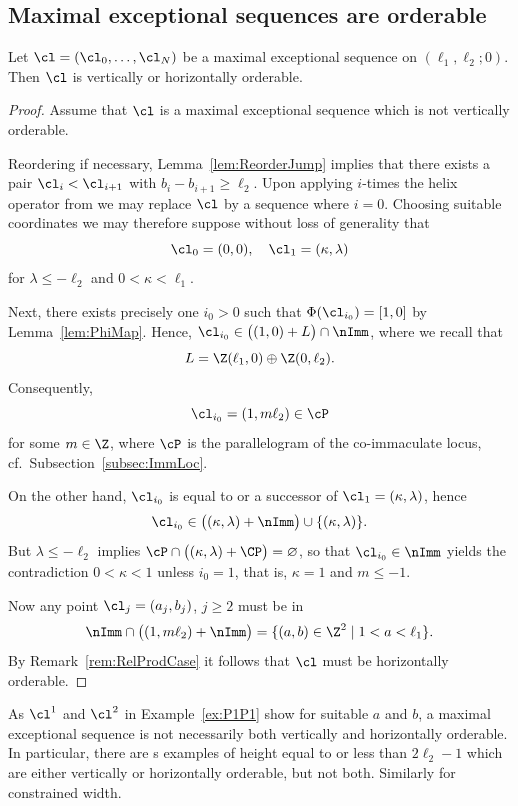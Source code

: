 \subsection{Maximal exceptional 
sequences are orderable}
\label{subsec:ReLExProdCase}

\begin{theorem}
\label{thm:MESRelProdCase}
Let $\cl=(\cl_0,\ldots,\cl_N)$ 
be a maximal exceptional sequence on 
$(\ell_1,\ell_2;0)$. Then $\cl$ is 
vertically or horizontally orderable. 
\end{theorem}

\begin{proof}
{Assume that $\cl$ is a maximal 
exceptional sequence which is {not vertically} 
orderable.}

{Reordering if necessary, Lemma~\ref{lem:ReorderJump}
implies that there exists a pair $\cl_i<\cl_{i+1}$
with $b_i-b_{i+1}\geq\ell_2$. Upon
applying $i$-times the helix operator from 
 we may replace $\cl$
by a sequence where $i=0$. Choosing suitable
coordinates we may therefore suppose
without loss of generality that
$$
\cl_0=(0,0),\quad\cl_1=(\kappa,\lambda)
$$
for $\lambda\leq-\ell_2$ and 
$0<\kappa<\ell_1$.}

{Next, there exists precisely 
one $i_0>0$ such that $\Phi(\cl_{i_0})=[1,0]$
by Lemma~\ref{lem:PhiMap}. Hence, 
$\cl_{i_0}\in\big((1,0)+L\big)\cap\nImm$, 
where we recall that
$$
L=\Z(\ell_1,0)\oplus\Z(0,\ell_2).
$$
Consequently, 
$$
\cl_{i_0}=(1,m\ell_2)\in\cP
$$
for some $m\in\Z$, where $\cP$ is the parallelogram of the 
{co-immaculate} locus, cf.\ Subsection~\ref{subsec:ImmLoc}.}

{On the other hand, $\cl_{i_0}$ is equal to or 
a successor of $\cl_1=(\kappa,\lambda)$, hence
$$
\cl_{i_0}\in\big((\kappa,\lambda)+\nImm\big)
\cup\{(\kappa,\lambda)\}.
$$
But $\lambda\leq-\ell_2$ implies 
$\cP\cap\big((\kappa,\lambda)+\CP\big)=\varnothing$, 
so that $\cl_{i_0}\in\nImm$ yields the contradiction 
$0<\kappa<1$ unless $i_0=1$, that is, $\kappa=1$ and $m\leq-1$.}

{Now any point $\cl_j=(a_j,b_j)$, $j\geq2$ must be in 
\[
\nImm\cap\big((1,m\ell_2)+\nImm\big)=\{(a,b)\in\Z^2\mid1<a<\ell_1\}. 
\]
By Remark~\ref{rem:RelProdCase} it follows that $\cl$ 
must be horizontally orderable.}
\end{proof}

\begin{rema}
As $\cl^1$ and $\cl^2$ in Example~\ref{ex:P1P1} 
show for suitable $a$ and $b$, a maximal 
exceptional sequence is not necessarily both 
vertically and horizontally orderable. In particular,
there are \mes s examples of height equal to or less than 
$2\ell_2-1$ which are either vertically or
horizontally orderable, but not both. 
Similarly for constrained width.
\end{rema}

